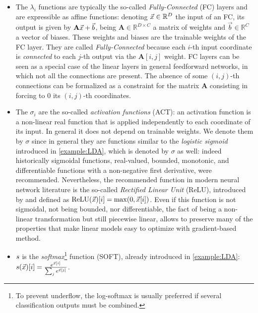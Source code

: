 \begin{itemize}
\item The $\lambda_i$ functions are typically the so-called \emph{Fully-Connected} (FC) layers and are expressible as affine functions: denoting $\vec{x}\in\mathbb{R}^D$ the input of an FC, its output is given by $\textbf{A}\vec{x} + \vec{b}$, being $\textbf{A}\in\mathbb{R}^{D\times C}$ a matrix of weights and $\vec{b}\in\mathbb{R}^C$ a vector of biases. These weights and biases are the trainable weights of the FC layer. They are called \emph{Fully-Connected} because each $i$-th input coordinate is \emph{connected} to each $j$-th output via the $\textbf{A}[i,j]$ weight. FC layers can be seen as a special case of the linear layers in general feedforward networks, in which not all the connections are present. The absence of some $(i,j)$-th connections can be formalized as a constraint for the matrix $\textbf{A}$ consisting in forcing to $0$ its $(i,j)$-th coordinates.

\item  The $\sigma_i$ are the so-called \emph{activation functions} (ACT): an activation function is a non-linear real function that is applied independently to each coordinate of its input. In general it does not depend on trainable weights. We denote them by $\sigma$ since in general they are functions similar to the \emph{logistic sigmoid} introduced in \ref{example:LDA}, which is denoted by $\sigma$ as well: indeed historically sigmoidal functions, \ie real-valued, bounded, monotonic, and differentiable functions with a non-negative first derivative, were recommended. Nevertheless, the recommended function in modern neural network literature is the so-called \emph{Rectified Linear Unit} (ReLU), introduced by \cite{nair2010rectified} and defined as $\mathrm{ReLU}(\vec{x})[i] = \max(0,\vec{x}[i])$. Even if this function is not sigmoidal, not being bounded, nor differentiable, the fact of being a non-linear transformation but still piecewise linear, allows to preserve many of the properties that make linear models easy to optimize with gradient-based method.
 

\item $s$ is the \emph{softmax}\footnote{To prevent underflow, the log-softmax is usually preferred if several classification outputs must be combined.} function (SOFT), already introduced in \ref{example:LDA}: $s(\vec{x})[i] = \frac{e^{\vec{x}[i]}}{\sum_{j}e^{\vec{x}[j]}}$.
\end{itemize}
 
